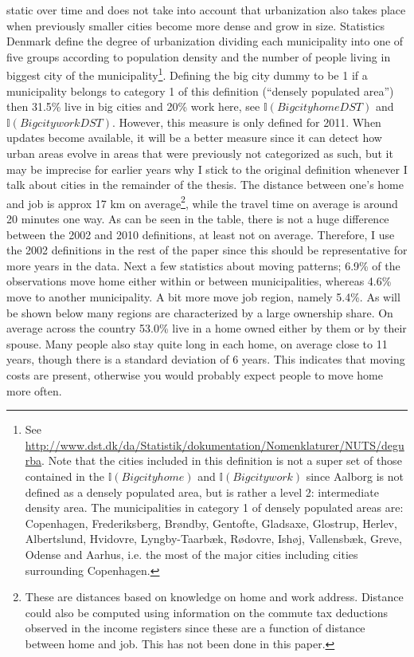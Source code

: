 static over time and does not take into account that urbanization also takes place when previously smaller cities become more dense and grow in size. Statistics Denmark define the degree of urbanization dividing each municipality into one of five groups according to population density and the number of people living in biggest city of the municipality\footnote{See \url{http://www.dst.dk/da/Statistik/dokumentation/Nomenklaturer/NUTS/degurba}.  Note that the cities included in this definition is not a super set of those contained in the $\mathbb{I}{(Big city home)}$  and $\mathbb{I}{(Big city work)}$ since Aalborg is not defined as a densely populated area, but is rather a level 2: intermediate density area. The municipalities in category 1 of densely populated areas are: Copenhagen, Frederiksberg, Brøndby, Gentofte, Gladsaxe, Glostrup, Herlev, Albertslund, Hvidovre, Lyngby-Taarbæk, Rødovre, Ishøj, Vallensbæk, Greve, Odense and Aarhus, i.e. the most of the major cities including cities surrounding Copenhagen.}. Defining the big city dummy to be 1 if a municipality belongs to category 1 of this definition (``densely populated area'') then 31.5\% live in big cities and 20\% work here, see $\mathbb{I}{(Big city home DST)}$ and $\mathbb{I}{(Big city work DST)}$. However, this measure is only defined for 2011. When updates become available, it will be a better measure since it can detect how urban areas evolve in areas that were previously not categorized as such, but it may be imprecise for earlier years why I stick to the original definition whenever I talk about cities in the remainder of the thesis. The distance between one's home and job is approx 17 km on average\footnote{These are distances based on knowledge on home and work address. Distance could also be computed using information on the commute tax deductions observed in the income registers since these are a function of distance between home and job. This has not been done in this paper.}, while the travel time on average is around 20 minutes one way. As can be seen in the table, there is not a huge difference between the 2002 and 2010 definitions, at least not on average. Therefore, I use the 2002 definitions in the rest of the paper since this should be representative for more years in the data. Next a few statistics about moving patterns; 6.9\% of the observations move home either within or between municipalities, whereas 4.6\% move to another municipality. A bit more move job region, namely 5.4\%. As will be shown below many regions are characterized by a large ownership share. On average across the country 53.0\% live in a home owned either by them or by their spouse. Many people also stay quite long in each home, on average close to 11 years, though there is a standard deviation of 6 years. This indicates that moving costs are present, otherwise you would probably expect people to move home more often.  

